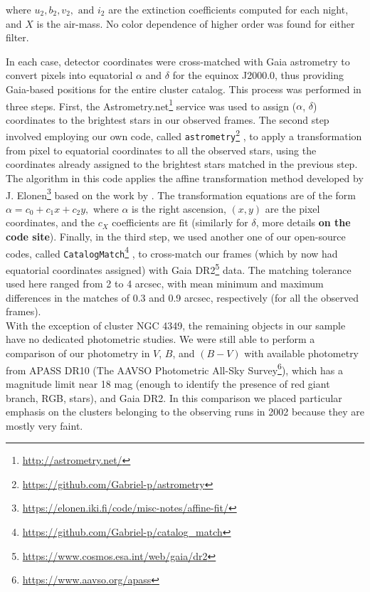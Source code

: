 \documentclass[draft]{aa}
\begin{document}
\noindent where $u_2, b_2, v_2,\text{ and } i_2$ are the extinction coefficients computed
for each night, and $X$ is the air-mass. No color dependence of higher
order was found for either filter.

In each case, detector coordinates were cross-matched with Gaia astrometry to
convert pixels into equatorial $\alpha$ and $\delta$ for the equinox J2000.0,
thus providing Gaia-based positions for the entire cluster catalog.
This process was performed in three steps. First, the
Astrometry.net\footnote{\url{http://astrometry.net/}} service was used to
assign ($\alpha$, $\delta$) coordinates to the brightest stars in our observed
frames. The second step involved employing our own code, called 
\texttt{astrometry}\footnote{\url{https://github.com/Gabriel-p/astrometry}} , to
apply a transformation from pixel to equatorial coordinates to all the observed
stars, using the coordinates already assigned to the brightest stars matched in
the previous step. The algorithm in this code applies the affine transformation
method developed by
J. Elonen\footnote{\url{https://elonen.iki.fi/code/misc-notes/affine-fit/}}
based on the work by \cite{Spath2004}. The transformation equations are of
the form $\alpha=c_0+c_1x+c_2y,$ where $\alpha$ is the right ascension,
$(x, y)$ are the pixel coordinates, and the $c_X$ coefficients are fit
(similarly for $\delta$, more details \textbf{on the code site}).
Finally, in the third step, we used another one of our open-source codes, called
\texttt{CatalogMatch}\footnote{\url{https://github.com/Gabriel-p/catalog_match}}
, to cross-match our frames (which by now had equatorial coordinates assigned)
with Gaia DR2\footnote{\url{https://www.cosmos.esa.int/web/gaia/dr2}} data. The
matching tolerance used here ranged from 2 to 4 arcsec, with mean
minimum and maximum differences in the matches of 0.3 and 0.9 arcsec,
respectively (for all the observed frames).\\


With the exception of cluster NGC 4349, the remaining objects in our
sample have no dedicated photometric studies. We were still able to perform
a comparison of our photometry in $V$, $B$, and $(B-V)$ with available
photometry from APASS DR10 (The AAVSO Photometric All-Sky
Survey\footnote{\url{https://www.aavso.org/apass}}), which has a
magnitude limit near 18 mag (enough to identify the presence of red giant branch, RGB, stars), and
Gaia DR2.
%
In this comparison we placed particular emphasis on the clusters belonging to the
observing runs in 2002 because they are mostly very faint.
\end{document}
